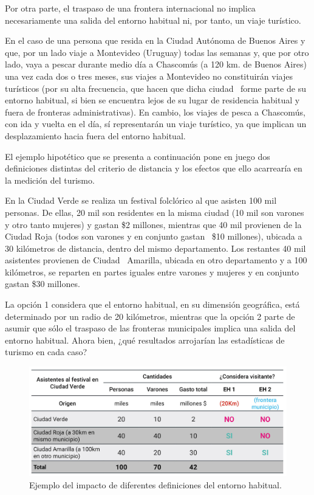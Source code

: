 \documentclass[
  openany]{book}
\begin{document}
Por otra parte, el traspaso de una frontera internacional no implica necesariamente una salida del entorno habitual ni, por tanto, un viaje turístico.~

En el caso de una persona que resida en la Ciudad Autónoma de Buenos Aires y que, por un lado viaje a Montevideo (Uruguay) todas las semanas y, que por otro lado, vaya a pescar durante medio día a Chascomús (a 120 km. de Buenos Aires) una vez cada dos o tres meses, sus viajes a Montevideo no constituirán viajes turísticos (por su alta frecuencia, que hacen que dicha ciudad~ forme parte de su entorno habitual, si bien se encuentra lejos de su lugar de residencia habitual y fuera de fronteras administrativas). En cambio, los viajes de pesca a Chascomús, con ida y vuelta en el día, sí representarán un viaje turístico, ya que implican un desplazamiento hacia fuera del entorno habitual.

El ejemplo hipotético que se presenta a continuación pone en juego dos definiciones distintas del criterio de distancia y los efectos que ello acarrearía en la medición del turismo.

En la Ciudad Verde se realiza un festival folclórico al que asisten 100 mil personas. De ellas, 20 mil son residentes en la misma ciudad (10 mil son varones y otro tanto mujeres) y gastan \$2 millones, mientras que 40 mil provienen de la Ciudad Roja (todos son varones y en conjunto gastan~ \$10 millones), ubicada a 30 kilómetros de distancia, dentro del mismo departamento. Los restantes 40 mil asistentes provienen de Ciudad~ Amarilla, ubicada en otro departamento y a 100 kilómetros, se reparten en partes iguales entre varones y mujeres y en conjunto gastan \$30 millones.

La opción 1 considera que el entorno habitual, en su dimensión geográfica, está determinado por un radio de 20 kilómetros, mientras que la opción 2 parte de asumir que sólo el traspaso de las fronteras municipales implica una salida del entorno habitual. Ahora bien, ¿qué resultados arrojarían las estadísticas de turismo en cada caso?

\begin{figure}

{\centering \includegraphics[width=0.8\linewidth]{imagenes/figura1.2} 

}

\caption{Ejemplo del impacto de diferentes definiciones del entorno habitual.}\label{fig:entorno}
\end{figure}
\end{document}
